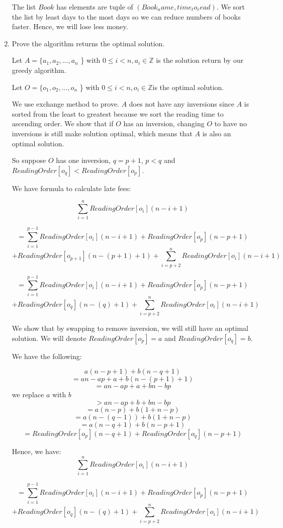 \documentclass{cpsc413Solutions}
\begin{document}
\begin{problemlist}
\begin{problem}
\begin{answer}
\begin{enumerate}
    The list $Book$ has elements are tuple of $(Book_name, time_to_read)$. We sort the list by least days to the most days so we can reduce numbers of books faster. Hence, we will lose less money.
    
    \item Prove the algorithm returns the optimal solution.
    
     Let $A  = \{a_1,a_2, \dots ,a_n$ \} with $0 \leq i < n, a_i\in \mathbb{Z}$ is the solution return by our greedy algorithm.
    
    Let $O  = \{o_1,o_2, \dots ,o_n$ \} with  $0 \leq i < n, o_i\in \mathbb{Z}$is the optimal solution.
    
    We use exchange method to prove. $A$ does not have any inversions since $A$ is sorted from the least to greatest because we sort the reading time to ascending order. We show that if $O$ has an inversion, changing $O$ to have no inversions is still make solution optimal, which means that $A$ is also an optimal solution.
    
    So suppose $O$ has one inversion, $q=p+1$, $p<q$ and $ReadingOrder[o_q] < ReadingOrder[o_p]$.
    
    We have formula to calculate late fees:
    
    $$\sum_{i=1}^n ReadingOrder[o_i](n-i+1)$$
    
    $$= \sum_{i=1}^{p-1} ReadingOrder[o_i](n-i+1) +
    ReadingOrder[o_p](n-p+1)$$
    $$+ ReadingOrder[o_{p+1}](n-(p+1)+1) +
    \sum_{i=p+2}^{n} ReadingOrder[o_i](n-i+1)$$
    
    $$= \sum_{i=1}^{p-1} ReadingOrder[o_i](n-i+1) +
    ReadingOrder[o_p](n-p+1)$$
    $$+ ReadingOrder[o_{q}](n-(q)+1) +
    \sum_{i=p+2}^{n} ReadingOrder[o_i](n-i+1)$$
    
    
    We show that by swapping to remove inversion, we will still have an optimal solution. We will denote $ReadingOrder[o_p]=a$ and $ReadingOrder[o_q]=b$.
    
    We have the following:
    
    $$a (n-p+1) + b(n-q+1)$$
    $$= an-ap+a + b(n-(p+1)+1)$$
    $$= an-ap+a + bn -bp$$
    we replace $a$ with $b$
    $$> an-ap+b + bn -bp$$ 
    $$= a(n-p) + b(1+n-p)$$
    $$= a(n-(q-1)) + b(1+n-p)$$
    $$= a(n-q+1) + b(n-p+1)$$ 
    $$= ReadingOrder[o_p](n-q+1) +ReadingOrder[o_q](n-p+1)$$
    
    
    Hence, we have:
    $$\sum_{i=1}^n ReadingOrder[o_i](n-i+1)$$
    
    $$= \sum_{i=1}^{p-1} ReadingOrder[o_i](n-i+1) +
    ReadingOrder[o_p](n-p+1)$$
    $$+ ReadingOrder[o_{q}](n-(q)+1) +
    \sum_{i=p+2}^{n} ReadingOrder[o_i](n-i+1)$$
    

\end{enumerate}
\end{answer}
\end{problem}
\end{problemlist}
\end{document}
